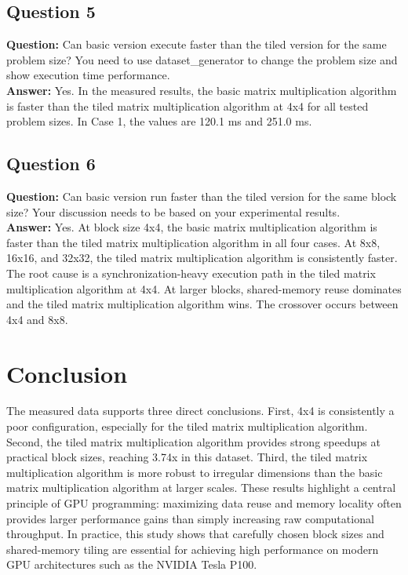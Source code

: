 \documentclass[11pt]{article}
\begin{document}
\subsection*{Question 5}
\textbf{Question:} Can basic version execute faster than the tiled version for the same problem size? You need to use dataset\_generator to change the problem size and show execution time performance.\\
\textbf{Answer:} Yes. In the measured results,
 the basic matrix multiplication algorithm is faster 
 than the tiled matrix multiplication algorithm at 4x4
  for all tested problem sizes. In Case 1,
   the values are 120.1 ms and 251.0 ms.

\subsection*{Question 6}
\textbf{Question:} Can basic version run faster than the tiled version for the same block size? Your discussion needs to be based on your experimental results.\\
\textbf{Answer:} Yes. At block size 4x4, the basic matrix multiplication algorithm is faster than the tiled matrix multiplication algorithm in all four cases. At 8x8, 16x16, and 32x32, the tiled matrix multiplication algorithm is consistently faster. The root cause is a synchronization-heavy execution path in the tiled matrix multiplication algorithm at 4x4. At larger blocks, shared-memory reuse dominates and the tiled matrix multiplication algorithm wins. The crossover occurs between 4x4 and 8x8.

\section{Conclusion}
The measured data supports three direct conclusions.
First, 4x4 is consistently a poor configuration, especially for the tiled matrix multiplication algorithm.
Second, the tiled matrix multiplication algorithm provides strong speedups at practical block sizes, reaching 3.74x in this dataset.
Third, the tiled matrix multiplication algorithm is more robust to irregular dimensions than the basic matrix multiplication algorithm at larger scales.
These results highlight a central principle of GPU programming:
maximizing data reuse and memory locality often provides larger
performance gains than simply increasing raw computational throughput.
In practice, this study shows that carefully chosen block sizes
and shared-memory tiling are essential for achieving high
performance on modern GPU architectures such as the NVIDIA Tesla P100.
\end{document}
